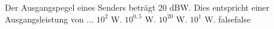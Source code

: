     {Der Ausgangspegel eines Senders beträgt 20 dBW. Dies entspricht einer Ausgangsleistung von ...}
    {$10^2$ W.}
    {$10^{0,5}$ W.}
    {$10^{20}$ W.}
    {$10^1$ W.}
    {false}{false}